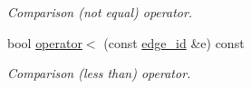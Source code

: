 \begin{DoxyCompactItemize}
\begin{DoxyCompactList}\small\item\em Comparison (not equal) operator. \end{DoxyCompactList}\item 
\hypertarget{structmerlin_1_1edge__id_a49ad1cddafba83aa3d5aab55d4ca6bb5}{}bool \hyperlink{structmerlin_1_1edge__id_a49ad1cddafba83aa3d5aab55d4ca6bb5}{operator$<$} (const \hyperlink{structmerlin_1_1edge__id}{edge\+\_\+id} \&e) const \label{structmerlin_1_1edge__id_a49ad1cddafba83aa3d5aab55d4ca6bb5}

\begin{DoxyCompactList}\small\item\em Comparison (less than) operator. \end{DoxyCompactList}\end{DoxyCompactItemize}
